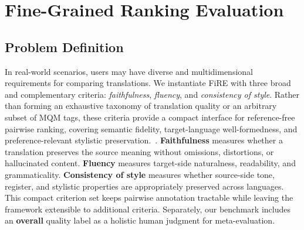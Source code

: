 \documentclass{article}
\theoremstyle{plain}
\theoremstyle{definition}
\theoremstyle{remark}
\newcommand{\ours}{FiRE }
\begin{document}
\section{Fine-Grained Ranking Evaluation}


\subsection{Problem Definition}

In real-world scenarios, users may have diverse and multidimensional requirements for comparing translations. We instantiate \ours with three broad and complementary criteria: \textit{faithfulness}, \textit{fluency}, and \textit{consistency of style}. Rather than forming an exhaustive taxonomy of translation quality or an arbitrary subset of MQM tags, these criteria provide a compact interface for reference-free pairwise ranking, covering semantic fidelity, target-language well-formedness, and preference-relevant stylistic preservation.~\citep{Kirchhoff2012EvaluatingUP,Lommel2013MultidimensionalQM,Sun2024PMMTPA}. \textbf{Faithfulness} measures whether a translation preserves the source meaning without omissions, distortions, or hallucinated content. \textbf{Fluency} measures target-side naturalness, readability, and grammaticality. \textbf{Consistency of style} measures whether source-side tone, register, and stylistic properties are appropriately preserved across languages. This compact criterion set keeps pairwise annotation tractable while leaving the framework extensible to additional criteria. Separately, our benchmark includes an \textbf{overall} quality label as a holistic human judgment for meta-evaluation.
\end{document}
